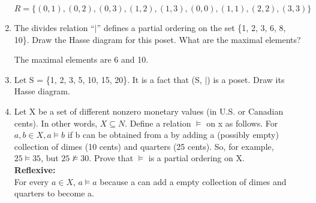 \documentclass[12pt]{article}
\begin{document}
\begin{enumerate}
  \[R = \{(0,1),(0,2),(0,3),(1,2),(1,3),(0,0),(1,1),(2,2),(3,3)\}\]
  \newpage
  \item The divides relation “$|$” defines a partial ordering on the set \{1, 2, 3, 6, 8, 10\}. Draw the Hasse diagram for this poset. What are the maximal elements?
  \begin{center}
  \end{center}
  The maximal elements are 6 and 10.
  \item Let S = \{1, 2, 3, 5, 10, 15, 20\}. It is a fact that (S, $|$) is a poset. Draw its Hasse diagram.
  \begin{center}
  \end{center}
  \item Let X be a set of different nonzero monetary values (in U.S. or Canadian cents). In other words, $X \subseteq N$. Define a relation $\vDash$ on x as follows. For $a, b \in X, a \vDash b$ if b can be obtained from a by adding a (possibly empty) collection of dimes (10 cents) and quarters (25 cents). So, for example, $25 \vDash 35$, but $25 \not\vDash 30$. Prove that $\vDash$ is a partial ordering on X.\\
  \textbf{Reflexive: }\\
  For every $a \in X$, $a \vDash a$ because a can add a empty collection of dimes and quarters to become a.\\

\end{enumerate}
\end{document}
